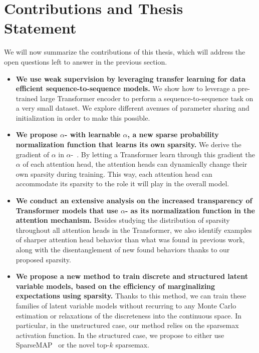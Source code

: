 \section{Contributions and Thesis Statement}
\label{sec:int_contributions}

We will now summarize the contributions of this thesis, which will
address the open questions left to answer in the previous section.

\begin{itemize}

      \item \textbf{We use weak supervision by leveraging transfer learning
                  for data efficient sequence-to-sequence models.}
            We show how to leverage a pre-trained large Transformer
            encoder to perform a sequence-to-sequence task on a very
            small dataset. We explore different avenues of parameter
            sharing and initialization in order to make this
            possible.


      \item \textbf{We propose {\boldmath $\alpha$}-\entmaxtext{} with
                  learnable {\boldmath $\alpha$}, a new sparse probability
                  normalization function that learns its own sparsity.}
            We derive the gradient of $\alpha$ in
            $\alpha$-\entmaxtext{}~\citep{entmax}. By letting a
            Transformer learn through this gradient the $\alpha$ of
            each attention head, the attention heads can dynamically
            change their own sparsity during training. This way, each
            attention head can accommodate its sparsity to the role
            it will play in the overall model.

      \item \textbf{We conduct an extensive analysis on the increased
                  transparency of Transformer models that use {\boldmath
                              $\alpha$}-\entmaxtext{} as its normalization function in the
                  attention mechanism.}
            Besides studying the distribution of sparsity
            throughout all attention heads in the Transformer, we also identify
            examples of sharper attention head behavior than what was found in
            previous work, along with the disentanglement of new found behaviors
            thanks to our proposed sparsity.

      \item \textbf{We propose a new method to train discrete and
                  structured latent variable models, based on the
                  efficiency of marginalizing expectations using
                  sparsity.}
            Thanks to this method, we can train these families of
            latent variable models without recurring to any Monte Carlo
            estimation or relaxations of the discreteness into the
            continuous space. In particular, in the unstructured
            case, our method relies on the sparsemax activation
            function. In the structured case, we propose to either
            use SparseMAP~\citep{niculae2018sparsemap} or the
            novel top-$k$ sparsemax.


\end{itemize}
